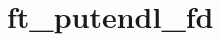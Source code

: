 \chapter{ft\+\_\+putendl\+\_\+fd}
\hypertarget{md_Documentation_2ft__putendl__fd}{}\label{md_Documentation_2ft__putendl__fd}
